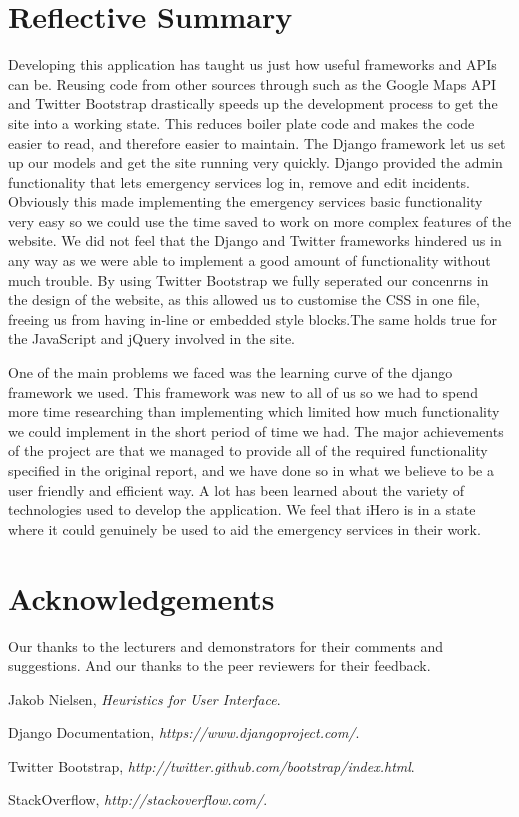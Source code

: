 \documentclass{sig-alt-release2}
\begin{document}
\section{Reflective Summary}
Developing this application has taught us just how useful frameworks and APIs can be. Reusing code from other sources through such as the Google Maps API and Twitter Bootstrap drastically speeds up the development process to get the site into a working state. This reduces boiler plate code and makes the code easier to read, and therefore easier to maintain. The Django framework let us set up our models and get the site running very quickly. Django provided the admin functionality that lets emergency services log in, remove and edit incidents. Obviously this made implementing the emergency services basic functionality very easy so we could use the time saved to work on more complex features of the website. We did not feel that the Django and Twitter frameworks hindered us in any way as we were able to implement a good amount of functionality without much trouble. By using Twitter Bootstrap we fully seperated our concenrns in the design of the website, as this allowed us to customise the CSS in one file, freeing us from having in-line or embedded style blocks.The same holds true for the JavaScript and jQuery involved in the site.

One of the main problems we faced was the learning curve of the django framework we used. This framework was new to all of us so we had to spend more time researching than implementing which limited how much functionality we could implement in the short period of time we had. The major achievements of the project are that we managed to provide all of the required functionality specified in the original report, and we have done so in what we believe to be a user friendly and efficient way. A lot has been learned about the variety of technologies used to develop the application. We feel that iHero is in a state where it could genuinely be used to aid the emergency services in their work. 

\section{Acknowledgements}
Our thanks to the lecturers and demonstrators for their comments and suggestions. And our thanks to the peer reviewers for their feedback.

\begin{thebibliography}{9}

  Jakob Nielsen,
  \emph{Heuristics for User Interface}.

  Django Documentation,
  \emph{https://www.djangoproject.com/}.

  Twitter Bootstrap,
  \emph{http://twitter.github.com/bootstrap/index.html}.

  StackOverflow,
  \emph{http://stackoverflow.com/}.

\end{thebibliography}
\end{document}
